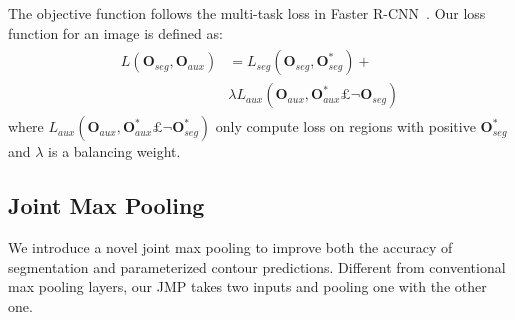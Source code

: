The objective function follows the multi-task loss in Faster R-CNN~\cite{Ren2015}.
Our loss function for an image is defined as:
\begin{eqnarray}\label{EqLoss}
\begin{aligned}
L(\mathbf{O}_{seg},\mathbf{O}_{aux}) &= L_{seg}(\mathbf{O}_{seg},\mathbf{O}_{seg}^*)+\\
&\lambda L_{aux}(\mathbf{O}_{aux},\mathbf{O}_{aux}^*£¬\mathbf{O}_{seg})
\end{aligned}
\end{eqnarray}
where $L_{aux}(\mathbf{O}_{aux},\mathbf{O}_{aux}^*£¬\mathbf{O}_{seg}^*)$ only compute loss on regions with positive $\mathbf{O}_{seg}^*$ and $\lambda$ is a balancing weight.




\subsection{Joint Max Pooling}
\label{sec:joint-max-pooling}

%
We introduce a novel joint max pooling to improve both the accuracy of segmentation and parameterized contour predictions.
Different from conventional max pooling layers, our JMP takes two inputs and pooling one with the other one.

